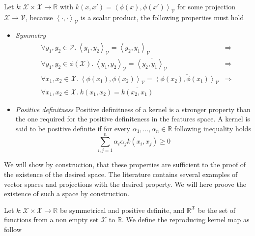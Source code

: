 Let $k :\mathcal{X} \times \mathcal{X} \rightarrow \mathbb{R}$ with $k(x, x') = \left<\phi(x), \phi(x')\right>_{\mathcal{V}}$ for some projection $\mathcal{X} \rightarrow \mathcal{V}$, because $\left<\cdot, \cdot\right>_{\mathcal{V}}$ is a scalar product, the following properties must hold

\begin{itemize}
\item \textit{Symmetry}
  \begin{equation*}
    \begin{aligned}
      & \forall y_1, y_2 \in \mathcal{V}.\ 
      \left<y_1, y_2\right>_{\mathcal{V}} = \overline{\left<y_2, y_1\right>_{\mathcal{V}}} & \Rightarrow\\
      & \forall y_1, y_2 \in \phi(\mathcal{X}).\ 
      \left<y_1, y_2\right>_{\mathcal{V}} = \overline{\left<y_2, y_1\right>_{\mathcal{V}}} & \Rightarrow\\
      &\forall x_1, x_2 \in \mathcal{X}.\ 
      \left<\phi(x_1), \phi(x_2)\right>_{\mathcal{V}} = \overline{\left<\phi(x_2), \phi(x_1)\right>_{\mathcal{V}}} &\Rightarrow\\
      &\forall x_1, x_2 \in \mathcal{X}.\ 
         k\left(x_1, x_2\right) = \overline{k\left(x_2, x_1\right)}
    \end{aligned}
  \end{equation*}

\item \textit{Positive definitness} Positive definitness of a kernel is a stronger property than the one required for the positive definiteness in the features space. A kernel is said to be positive definite if for every $\alpha_1, ..., \alpha_n \in \mathbb{R}$ following inequality holds
  \begin{equation*}
    \sum_{i,j=1}^n\alpha_i\alpha_jk\left(x_i, x_j\right) \geq 0
  \end{equation*}
\end{itemize}

We will show by construction, that these properties are sufficient to the proof of the existence of the desired space. The literature contains several examples of vector spaces and projections with the desired property. We will here proove the existence of such a space by construction.

Let $k : \mathcal{X} \times \mathcal{X} \rightarrow \mathbb{R}$ be symmetrical and positive definite, and $\mathbb{R}^{\mathcal{X}}$ be the set of functions from a non empty set $\mathcal{X}$ to $\mathbb{R}$. We define the reproducing kernel map as follow

